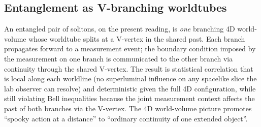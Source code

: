\subsection{Entanglement as V-branching worldtubes}

An entangled pair of solitons, on the present reading, is \emph{one} branching 4D world-volume whose worldtube splits at a V-vertex in the shared past.
Each branch propagates forward to a measurement event; the boundary condition imposed by the measurement on one branch is communicated to the other branch via continuity through the shared V-vertex.
The result is statistical correlation that is local along each worldline (no superluminal influence on any spacelike slice the lab observer can resolve) and deterministic given the full 4D configuration, while still violating Bell inequalities because the joint measurement context affects the past of both branches via the V-vertex.
The 4D world-volume picture promotes ``spooky action at a distance'' to ``ordinary continuity of one extended object''.

